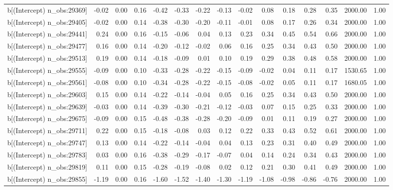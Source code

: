 \begin{table}[ht]
\begin{tabular}{rrrrrrrrrrrrrrr}
  b[(Intercept) n\_obs:29369] & -0.02 & 0.00 & 0.16 & -0.42 & -0.33 & -0.22 & -0.13 & -0.02 & 0.08 & 0.18 & 0.28 & 0.35 & 2000.00 & 1.00 \\ 
  b[(Intercept) n\_obs:29405] & -0.02 & 0.00 & 0.14 & -0.38 & -0.30 & -0.20 & -0.11 & -0.01 & 0.08 & 0.17 & 0.26 & 0.34 & 2000.00 & 1.00 \\ 
  b[(Intercept) n\_obs:29441] & 0.24 & 0.00 & 0.16 & -0.15 & -0.06 & 0.04 & 0.13 & 0.23 & 0.34 & 0.45 & 0.54 & 0.66 & 2000.00 & 1.00 \\ 
  b[(Intercept) n\_obs:29477] & 0.16 & 0.00 & 0.14 & -0.20 & -0.12 & -0.02 & 0.06 & 0.16 & 0.25 & 0.34 & 0.43 & 0.50 & 2000.00 & 1.00 \\ 
  b[(Intercept) n\_obs:29513] & 0.19 & 0.00 & 0.14 & -0.18 & -0.09 & 0.01 & 0.10 & 0.19 & 0.29 & 0.38 & 0.48 & 0.58 & 2000.00 & 1.00 \\ 
  b[(Intercept) n\_obs:29555] & -0.09 & 0.00 & 0.10 & -0.33 & -0.28 & -0.22 & -0.15 & -0.09 & -0.02 & 0.04 & 0.11 & 0.17 & 1530.65 & 1.00 \\ 
  b[(Intercept) n\_obs:29561] & -0.08 & 0.00 & 0.10 & -0.34 & -0.28 & -0.22 & -0.15 & -0.08 & -0.02 & 0.05 & 0.11 & 0.17 & 1680.05 & 1.00 \\ 
  b[(Intercept) n\_obs:29603] & 0.15 & 0.00 & 0.14 & -0.22 & -0.14 & -0.04 & 0.05 & 0.16 & 0.25 & 0.34 & 0.43 & 0.50 & 2000.00 & 1.00 \\ 
  b[(Intercept) n\_obs:29639] & -0.03 & 0.00 & 0.14 & -0.39 & -0.30 & -0.21 & -0.12 & -0.03 & 0.07 & 0.15 & 0.25 & 0.33 & 2000.00 & 1.00 \\ 
  b[(Intercept) n\_obs:29675] & -0.09 & 0.00 & 0.15 & -0.48 & -0.38 & -0.28 & -0.20 & -0.09 & 0.01 & 0.11 & 0.19 & 0.27 & 2000.00 & 1.00 \\ 
  b[(Intercept) n\_obs:29711] & 0.22 & 0.00 & 0.15 & -0.18 & -0.08 & 0.03 & 0.12 & 0.22 & 0.33 & 0.43 & 0.52 & 0.61 & 2000.00 & 1.00 \\ 
  b[(Intercept) n\_obs:29747] & 0.13 & 0.00 & 0.14 & -0.22 & -0.14 & -0.04 & 0.04 & 0.13 & 0.23 & 0.31 & 0.40 & 0.49 & 2000.00 & 1.00 \\ 
  b[(Intercept) n\_obs:29783] & 0.03 & 0.00 & 0.16 & -0.38 & -0.29 & -0.17 & -0.07 & 0.04 & 0.14 & 0.24 & 0.34 & 0.43 & 2000.00 & 1.00 \\ 
  b[(Intercept) n\_obs:29819] & 0.11 & 0.00 & 0.15 & -0.28 & -0.19 & -0.08 & 0.02 & 0.12 & 0.21 & 0.30 & 0.41 & 0.49 & 2000.00 & 1.00 \\ 
  b[(Intercept) n\_obs:29855] & -1.19 & 0.00 & 0.16 & -1.60 & -1.52 & -1.40 & -1.30 & -1.19 & -1.08 & -0.98 & -0.86 & -0.76 & 2000.00 & 1.00 \\ 

\end{tabular}
\end{table}
